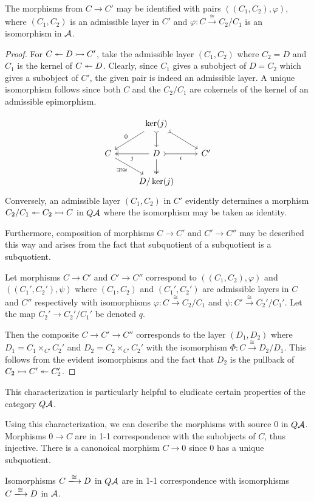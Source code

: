 \begin{proposition}\label{prop:Qadpair}
The morphisms from $C \to C'$ may be identified with pairs $((C_1,C_2),\varphi)$,
where $(C_1,C_2)$ is an admissible layer in $C'$ and $\varphi : C \xrightarrow{\cong} C_2/C_1$ is an isomorphism in $\mathcal{A}$.
\end{proposition}
\begin{proof}
For $C \twoheadleftarrow D \rightarrowtail C'$, take the admissible layer $(C_1, C_2)$ where $C_2 = D$ and $C_1$ is the kernel of $C \twoheadleftarrow D$.
Clearly, since $C_1$ gives a subobject of $D = C_2$ which gives a subobject of $C'$, the given pair is indeed
an admissible layer. A unique isomorphism follows since both $C$ and the $C_2/C_1$ are cokernels of the kernel of an admissible epimorphism.

\[
\begin{tikzcd}
  & \ker(j) \arrow[d, tail] \arrow[dl, "0"'] \arrow[dr, tail] & \\
C\arrow[dr, "\exists ! \cong"'] & D \arrow[l, two heads, "j"] \arrow[r, tail, "i"'] \arrow[d, two heads] & C' \\
  & D/\ker(j)&
\end{tikzcd}
\]
Conversely, an admissible layer $(C_1,C_2)$ in $C'$ evidently determines a morphism
$C_2/C_1 \twoheadleftarrow C_2 \rightarrowtail C$ in $Q\mathcal{A}$ where the isomorphism may be taken as identity.

Furthermore, composition of morphisms $C \to C'$ and $C' \to C''$ may be described this way and arises from the fact that
subquotient of a subquotient is a subquotient.

Let morphisms $C \to C'$ and $C' \to C''$ correspond to $((C_1,C_2),\varphi)$ and $((C_1',C_2'),\psi)$
where $(C_1,C_2)$
and $(C_1',C_2')$ are admissible layers in $C$ and $C''$ respectively with isomorphisms
$\varphi : C \xrightarrow{\cong} C_2/C_1$ and $\psi : C' \xrightarrow{\cong} C_2'/C_1'$.
Let the map $C_2' \to C_2'/C_1'$ be denoted $q$.

Then the composite $C \to C' \to C''$ corresponds to the layer $(D_1,D_2)$
where $D_1 = C_1 \times_{C'} C_2'$ and $D_2 = C_2 \times_{C'} C_2'$
with the isomorphism $\Phi : C \xrightarrow{\cong} D_2/D_1$.
This follows from the evident isomorphisms and the fact that
$D_2$ is the pullback of $C_2 \rightarrowtail C' \twoheadleftarrow C_2'$.
\end{proof}
This characterization is particularly helpful to eludicate certain properties of the category $Q\mathcal{A}$.

\begin{example}
Using this characterization, we can describe the morphisms with source $0$ in $Q\mathcal{A}$.
Morphisms $0 \to C$ are in 1-1 correspondence with the subobjects of $C$, thus injective.
There is a canonoical morphism $C \to 0$ since $0$ has a unique subquotient.
\end{example}
\begin{example}
Isomorphisms $C \xlongrightarrow{\cong} D$ in $Q\mathcal{A}$ are in 1-1 correspondence with isomorphisms $C \xlongrightarrow{\cong} D$ in $\mathcal{A}$.
\end{example}

